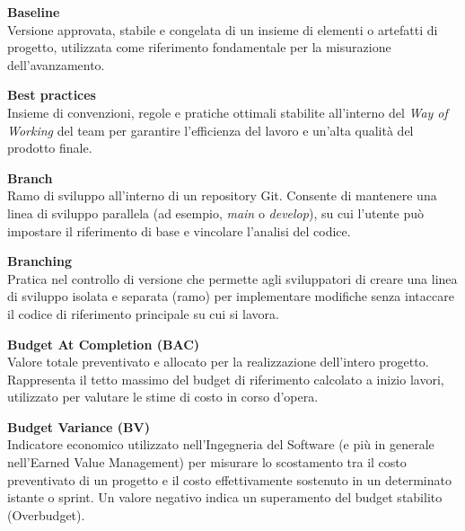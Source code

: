 \documentclass[12pt, a4paper]{article}
\begin{document}
\noindent\hypertarget{baseline}{\textbf{Baseline}} \\[0.1em]
Versione approvata, stabile e congelata di un insieme di elementi o artefatti di progetto, utilizzata come riferimento fondamentale per la misurazione dell'avanzamento.
\vspace{0.5cm}

\noindent\hypertarget{best-practices}{\textbf{Best practices}} \\[0.1em]
Insieme di convenzioni, regole e pratiche ottimali stabilite all'interno del \textit{Way of Working} del team per garantire l'efficienza del lavoro e un'alta qualità del prodotto finale.
\vspace{0.5cm}  

\noindent\hypertarget{branch}{\textbf{Branch}} \\[0.1em]
Ramo di sviluppo all'interno di un repository Git. Consente di mantenere una linea di sviluppo parallela (ad esempio, \textit{main} o \textit{develop}), su cui l'utente può impostare il riferimento di base e vincolare l'analisi del codice.
\vspace{0.5cm}  

\noindent\hypertarget{branching}{\textbf{Branching}} \\[0.1em]
Pratica nel controllo di versione che permette agli sviluppatori di creare una linea di sviluppo isolata e separata (ramo) per implementare modifiche senza intaccare il codice di riferimento principale su cui si lavora.
\vspace{0.5cm}

\newpage
\noindent\hypertarget{budget-at-completion}{\textbf{Budget At Completion (BAC)}} \\[0.1em]
Valore totale preventivato e allocato per la realizzazione dell'intero progetto. Rappresenta il tetto massimo del budget di riferimento calcolato a inizio lavori, utilizzato per valutare le stime di costo in corso d'opera.
\vspace{0.5cm}

\noindent\hypertarget{budget-variance}{\textbf{Budget Variance (BV)}} \\[0.1em]
Indicatore economico utilizzato nell'Ingegneria del Software (e più in generale nell'Earned Value Management) per misurare lo scostamento tra il costo preventivato di un progetto e il costo effettivamente sostenuto in un determinato istante o sprint. Un valore negativo indica un superamento del budget stabilito (Overbudget).
\vspace{0.5cm}
\end{document}
